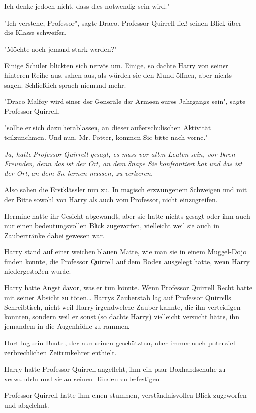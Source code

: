 {Ich denke jedoch nicht, dass dies notwendig sein wird."

"Ich verstehe, Professor", sagte Draco. Professor Quirrell ließ seinen Blick über die Klasse schweifen.

"Möchte noch jemand stark werden?"

Einige Schüler blickten sich nervös um. Einige, so dachte Harry von seiner hinteren Reihe aus, sahen aus, als würden sie den Mund öffnen, aber nichts sagen. Schließlich sprach niemand mehr.

"Draco Malfoy wird einer der Generäle der Armeen eures Jahrgangs sein", sagte Professor Quirrell,

"sollte er sich dazu herablassen, an dieser außerschulischen Aktivität teilzunehmen. Und nun, Mr. Potter, kommen Sie bitte nach vorne."

\emph{Ja, hatte Professor Quirrell gesagt, es muss vor allen Leuten sein, vor Ihren Freunden, denn das ist der Ort, an dem Snape Sie konfrontiert hat und das ist der Ort, an dem Sie lernen müssen, zu verlieren.}

Also sahen die Erstklässler nun zu. In magisch erzwungenem Schweigen und mit der Bitte sowohl von Harry als auch vom Professor, nicht einzugreifen.

Hermine hatte ihr Gesicht abgewandt, aber sie hatte nichts gesagt oder ihm auch nur einen bedeutungsvollen Blick zugeworfen, vielleicht weil sie auch in Zaubertränke dabei gewesen war.

Harry stand auf einer weichen blauen Matte, wie man sie in einem Muggel-Dojo finden konnte, die Professor Quirrell auf dem Boden ausgelegt hatte, wenn Harry niedergestoßen wurde.

Harry hatte Angst davor, was er tun könnte. Wenn Professor Quirrell Recht hatte mit seiner Absicht zu töten… Harrys Zauberstab lag auf Professor Quirrells Schreibtisch, nicht weil Harry irgendwelche Zauber kannte, die ihn verteidigen konnten, sondern weil er sonst (so dachte Harry) vielleicht versucht hätte, ihn jemandem in die Augenhöhle zu rammen.

Dort lag sein Beutel, der nun seinen geschützten, aber immer noch potenziell zerbrechlichen Zeitumkehrer enthielt.

Harry hatte Professor Quirrell angefleht, ihm ein paar Boxhandschuhe zu verwandeln und sie an seinen Händen zu befestigen.

Professor Quirrell hatte ihm einen stummen, verständnisvollen Blick zugeworfen und abgelehnt.

}
